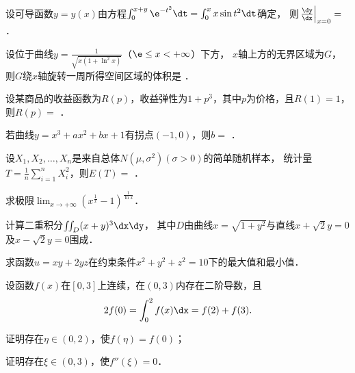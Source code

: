 \documentclass[plain,noanswer,medmath]{../../template/jnuexam}
\begin{document}
\begin{problem}
设可导函数$y = y(x)$由方程$\int_0^{x + y} \e^{- t^2} \dt = \int_0^x x\sin t^2 \dt$确定，
则$\left. \frac{\dy}{\dx} \right|_{x = 0} =$ \fillin{}．
\end{problem}


\begin{problem}
设位于曲线$y = \frac{1}{\sqrt{x(1 + \ln^2 x)}}$（$\e \le x < +\infty$）下方，
$x$轴上方的无界区域为$G$，则$G$绕$x$轴旋转一周所得空间区域的体积是 \fillin{}．
\end{problem}


\begin{problem}
设某商品的收益函数为$R(p)$，收益弹性为$1 + p^3$，其中$p$为价格，且$R(1) = 1$，则$R(p) =$ \fillin{}．
\end{problem}


\begin{problem}
若曲线$y = x^3 + ax^2 + bx + 1$有拐点$(- 1,0)$，则$b =$ \fillin{}．
\end{problem}




\begin{problem}
设$X_1,X_2, \ldots ,X_n$是来自总体$N(\mu ,\sigma^2)$$(\sigma > 0)$的简单随机样本，
统计量$T = \frac{1}{n}\sum_{i = 1}^n X_i^2$，则$E(T) =$ \fillin{}．
\end{problem}




\begin{problem}[points=10]
求极限$\lim_{x \to +\infty} (x^{\frac{1}{x}} - 1)^{\frac{1}{\ln x}}$．
\end{problem}


\begin{problem}[points=10]
计算二重积分$\iint_D (x + y)^3 \dx\dy$，
其中$D$由曲线$x = \sqrt{1 + y^2}$与直线$x + \sqrt{2} y = 0$及$x - \sqrt{2} y = 0$围成．
\end{problem}


\begin{problem}[points=10]
求函数$u = xy + 2yz$在约束条件$x^2 + y^2 + z^2 = 10$下的最大值和最小值．
\end{problem}




\begin{problem}[points=10]
设函数$f(x)$在$\left[0,3 \right]$上连续，在$\left(0,3 \right)$内存在二阶导数，且
$$2f(0) = \int_0^2 f(x)\dx = f(2) + f(3).$$
\begin{enumerate*}
\item 证明存在$\eta \in(0,2)$，使$f(\eta) = f(0)$；
\item 证明存在$\xi \in(0,3)$，使$f''(\xi) = 0$．
\end{enumerate*}
\end{problem}
\end{document}
